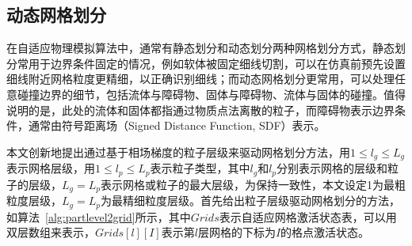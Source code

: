 

\subsection{动态网格划分}
在自适应物理模拟算法中，通常有静态划分和动态划分两种网格划分方式，静态划分常用于边界条件固定的情况，例如软体被固定细线切割，可以在仿真前预先设置细线附近网格粒度更精细，以正确识别细线；而动态网格划分更常用，可以处理任意碰撞边界的细节，包括流体与障碍物、固体与障碍物、流体与固体的碰撞。值得说明的是，此处的流体和固体都指通过物质点法离散的粒子，而障碍物表示边界条件，通常由符号距离场（Signed Distance Function, SDF）表示。

本文创新地提出通过基于相场梯度的粒子层级来驱动网格划分方法，用$1 \leq l_g \leq L_g$表示网格层级，用$1 \leq l_p \leq L_p$表示粒子类型，其中$l_g$和$l_p$分别表示网格的层级和粒子的层级，$L_g = L_p$表示网格或粒子的最大层级，为保持一致性，本文设定1为最粗粒度层级，$L_g = L_p$为最精细粒度层级。首先给出粒子层级驱动网格划分的方法，如算法~\ref{alg:partlevel2grid}所示，其中$Grids$表示自适应网格激活状态表，可以用双层数组来表示，$Grids[l][I]$表示第$l$层网格的下标为$I$的格点激活状态。

